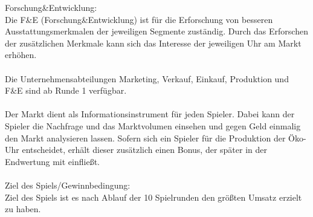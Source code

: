 Forschung\&Entwicklung:\\
Die F\&E (Forschung\&Entwicklung) ist für die Erforschung von besseren Ausstattungsmerkmalen der jeweiligen Segmente zuständig. Durch das Erforschen der zusätzlichen Merkmale kann sich das Interesse der jeweiligen Uhr am Markt erhöhen.\\
\\
Die Unternehmensabteilungen Marketing, Verkauf, Einkauf, Produktion und F\&E sind ab Runde 1 verfügbar.\\
\\
Der Markt dient als Informationsinstrument für jeden Spieler. Dabei kann der Spieler die Nachfrage und das Marktvolumen einsehen und gegen Geld einmalig den Markt analysieren lassen. Sofern sich ein Spieler für die Produktion der Öko-Uhr entscheidet, erhält dieser zusätzlich einen Bonus, der später in der Endwertung mit einfließt.\\ 
\\
Ziel des Spiels/Gewinnbedingung:\\
Ziel des Spiels ist es nach Ablauf der 10 Spielrunden den größten Umsatz erzielt zu haben.


